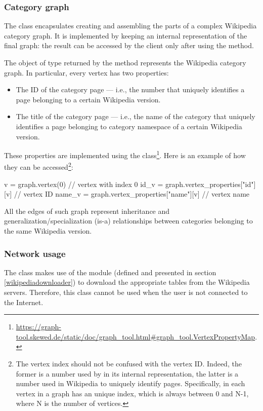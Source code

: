             \subsubsection{Category graph}\label{categorygraph}
                The  class encapsulates creating and assembling the parts of a complex Wikipedia category graph. It is implemented by keeping an internal representation of the final graph: the result can be accessed by the client only after using the  method.
                
                The object of type  returned by the  method represents the Wikipedia category graph. In particular, every vertex has two properties:
                \begin{itemize}
                    \item The ID of the category page --- i.e., the number that uniquely identifies a page belonging to a certain Wikipedia version.
                    \item The title of the category page --- i.e., the name of the category that uniquely identifies a page belonging to category namespace of a certain Wikipedia version.
                \end{itemize}
                These properties are implemented using the  class\footnote{\url{https://graph-tool.skewed.de/static/doc/graph_tool.html\#graph_tool.VertexPropertyMap}.}. Here is an example of how they can be accessed\footnote{The vertex index should not be confused with the vertex ID. Indeed, the former is a number used by  in its internal representation, the latter is a number used in Wikipedia to uniquely identify pages. Specifically, in  each vertex in a graph has an unique index, which is always between 0 and N-1, where N is the number of vertices.}:
                \begin{example}
v = graph.vertex(0) // vertex with index 0
id_v = graph.vertex_properties["id"][v] // vertex ID
name_v = graph.vertex_properties["name"][v] // vertex name
                \end{example}
                
                All the edges of such graph represent inheritance and generalization/specialization (is-a) relationships between categories belonging to the same Wikipedia version.
            \subsubsection{Network usage}
                The  class makes use of the  module (defined and presented in section \ref{wikipediadownloader}) to download the appropriate tables from the Wikipedia servers. Therefore, this class cannot be used when the user is not connected to the Internet.
                
